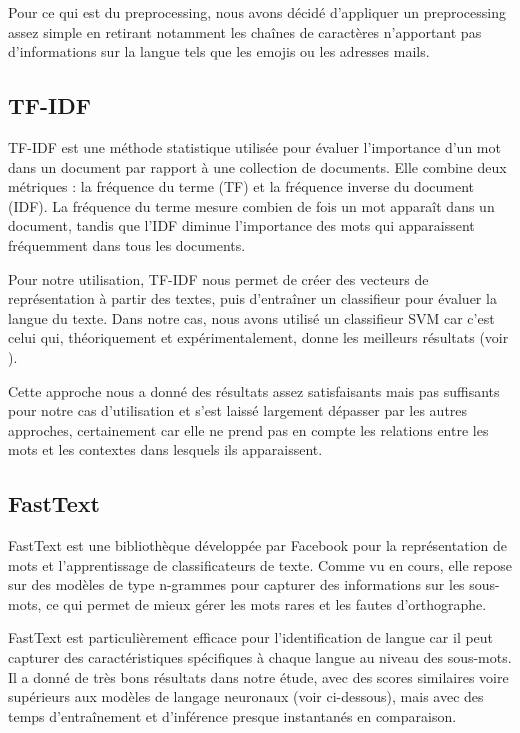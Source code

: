 Pour ce qui est du preprocessing, nous avons décidé d'appliquer un preprocessing assez simple en retirant notamment les chaînes de caractères n'apportant pas d'informations sur la langue tels que les emojis ou les adresses mails.

\subsection{TF-IDF}

TF-IDF est une méthode statistique utilisée pour évaluer l'importance d'un mot dans un document par rapport à une collection de documents. Elle combine deux métriques : la fréquence du terme (TF) et la fréquence inverse du document (IDF). La fréquence du terme mesure combien de fois un mot apparaît dans un document, tandis que l'IDF diminue l'importance des mots qui apparaissent fréquemment dans tous les documents.

Pour notre utilisation, TF-IDF nous permet de créer des vecteurs de représentation à partir des textes, puis d'entraîner un classifieur pour évaluer la langue du texte. Dans notre cas, nous avons utilisé un classifieur SVM car c'est celui qui, théoriquement et expérimentalement, donne les meilleurs résultats (voir \cite{baldwin2010language}).

Cette approche nous a donné des résultats assez satisfaisants mais pas suffisants pour notre cas d'utilisation et s'est laissé largement dépasser par les autres approches, certainement car elle ne prend pas en compte les relations entre les mots et les contextes dans lesquels ils apparaissent.

\subsection{FastText}

FastText est une bibliothèque développée par Facebook \cite{joulin2017bag} pour la représentation de mots et l'apprentissage de classificateurs de texte. Comme vu en cours, elle repose sur des modèles de type n-grammes pour capturer des informations sur les sous-mots, ce qui permet de mieux gérer les mots rares et les fautes d'orthographe.

FastText est particulièrement efficace pour l'identification de langue car il peut capturer des caractéristiques spécifiques à chaque langue au niveau des sous-mots. Il a donné de très bons résultats dans notre étude, avec des scores similaires voire supérieurs aux modèles de langage neuronaux (voir ci-dessous), mais avec des temps d'entraînement et d'inférence presque instantanés en comparaison.

